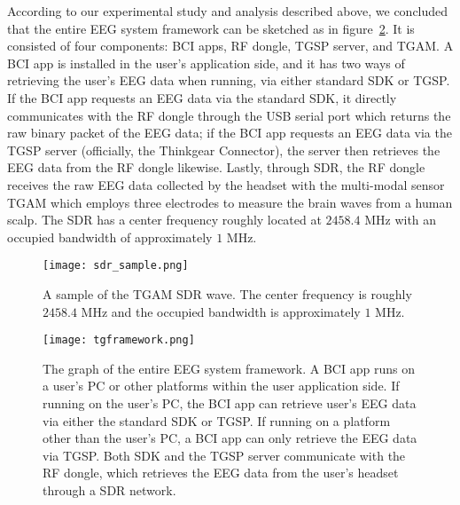 %
\indent According to our experimental study and analysis described above, we concluded that the entire EEG system framework can be sketched as in figure~\ref{fig:tgframework}. It is consisted of four components: BCI apps, RF dongle, TGSP server, and TGAM. A BCI app is installed in the user's application side, and it has two ways of retrieving the user's EEG data when running, via either standard SDK or TGSP. If the BCI app requests an EEG data via the standard SDK, it directly communicates with the RF dongle through the USB serial port which returns the raw binary packet of the EEG data; if the BCI app requests an EEG data via the TGSP server (officially, the Thinkgear Connector), the server then retrieves the EEG data from the RF dongle likewise. Lastly, through SDR, the RF dongle receives the raw EEG data collected by the headset with the multi-modal sensor TGAM which employs three electrodes to measure the brain waves from a human scalp. The SDR has a center frequency roughly located at $2458.4$ MHz with an occupied bandwidth of approximately $1$ MHz.

\begin{figure}[!htb]
        \centering
        \texttt{[image: sdr\_sample.png]}
        \caption{A sample of the TGAM SDR wave. The center frequency is roughly $2458.4$ MHz and the occupied bandwidth is approximately $1$ MHz.}
        \label{fig:sdrsample}
\end{figure}

\begin{figure}[!htb]
        \centering
        \texttt{[image: tgframework.png]}
        \caption{The graph of the entire EEG system framework. A BCI app runs on a user's PC or other platforms within the user application side. If running on the user's PC, the BCI app can retrieve user's EEG data via either the standard SDK or TGSP. If running on a platform other than the user's PC, a BCI app can only retrieve the EEG data via TGSP. Both SDK and the TGSP server communicate with the RF dongle, which retrieves the EEG data from the user's headset through a SDR network.}
        \label{fig:tgframework}
\end{figure}
